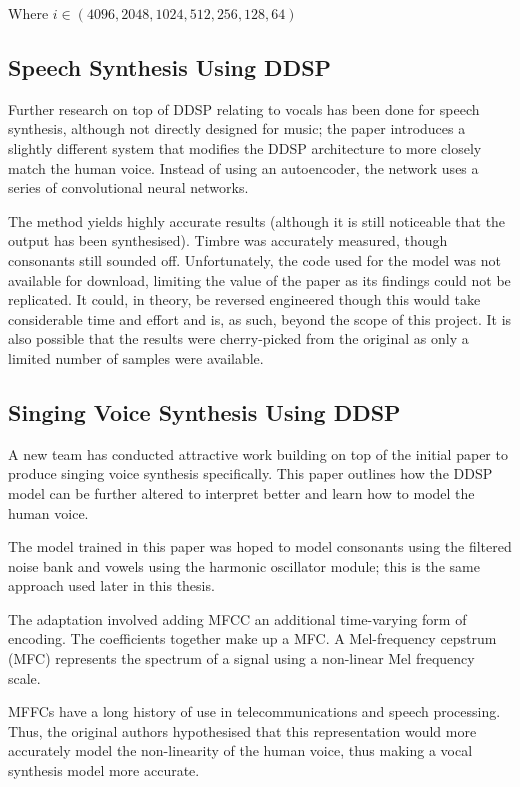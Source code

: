 Where $i \in (4096, 2048, 1024, 512, 256, 128, 64)$

\subsection{Speech Synthesis Using DDSP}

Further research on top of DDSP relating to vocals has been done for speech synthesis, although not directly designed for music; the paper introduces a slightly different system that modifies the DDSP architecture to more closely match the human voice\cite{SpeechDDSP}. Instead of using an autoencoder, the network uses a series of convolutional neural networks.

The method yields highly accurate results (although it is still noticeable that the output has been synthesised). Timbre was accurately measured, though consonants still sounded off. Unfortunately, the code used for the model was not available for download, limiting the value of the paper as its findings could not be replicated. It could, in theory, be reversed engineered though this would take considerable time and effort and is, as such, beyond the scope of this project. It is also possible that the results were cherry-picked from the original as only a limited number of samples were available.

\subsection{Singing Voice Synthesis Using DDSP}
\label{sec:singing_voice_synthesis}

A new team has conducted attractive work building on top of the initial paper to produce singing voice synthesis\cite{SingingDDSP} specifically. This paper outlines how the DDSP model can be further altered to interpret better and learn how to model the human voice.

The model trained in this paper was hoped to model consonants using the filtered noise bank and vowels using the harmonic oscillator module; this is the same approach used later in this thesis.

The adaptation involved adding \acrfull{MFCC} an additional time-varying form of encoding. The coefficients together make up a \acrfull{MFC}. A Mel-frequency cepstrum (MFC) represents the spectrum of a signal using a non-linear Mel frequency scale.

MFFCs have a long history of use in telecommunications and speech processing\cite{MFCCHistory}. Thus, the original authors hypothesised that this representation would more accurately model the non-linearity of the human voice, thus making a vocal synthesis model more accurate.

